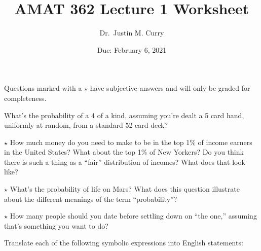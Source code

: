 \documentclass[addpoints,12pt]{exam}
\title{\vspace{-1in} AMAT 362 Lecture 1 Worksheet}
\date{Due: February 6, 2021}
\author{Dr.~Justin M. Curry}
\begin{document}
\maketitle



Questions marked with a $\star$ have subjective answers and will only be graded for completeness.

\begin{questions}

\question[2] What's the probability of a 4 of a kind, assuming you're dealt a 5 card hand, uniformly at random, from a standard 52 card deck?

\vspace{1in}

\question[1] $\star$ How much money do you need to make to be in the top 1\% of income earners in the United States? What about the top 1\% of New Yorkers? Do you think there is such a thing as a ``fair'' distribution of incomes? What does that look like?

\vspace{1in}

\question[1] $\star$ What's the probability of life on Mars? What does this question illustrate about the different meanings of the term ``probability''?

\vspace{1in}

%
\question[1] $\star$ How many people should you date before settling down on ``the one,'' assuming that's something you want to do?

\vspace{1in}

\question[6] Translate each of the following symbolic expressions into English statements:

\noaddpoints
{}
\end{questions}
\end{document}
